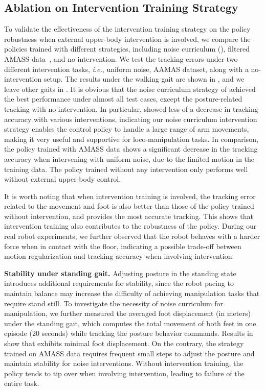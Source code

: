 \subsection{Ablation on Intervention Training Strategy}
\label{sec:InterventionExp}
To validate the effectiveness of the intervention training strategy on the policy robustness when external upper-body intervention is involved, we compare the policies trained with different strategies, including noise curriculum (\our), filtered AMASS data~\citep{he2024omnih2o}, and no intervention. We test the tracking errors under two different intervention tasks, \textit{i.e.}, uniform noise, AAMAS dataset, along with a no-intervention setup. The results under the walking gait are shown in , and we leave other gaits in . 
It is obvious that the noise curriculum strategy of \our achieved the best performance under almost all test cases, except the posture-related tracking with no intervention. 
In particular, \our showed less of a decrease in tracking accuracy with various interventions, indicating our noise curriculum intervention strategy enables the control policy to handle a large range of arm movements, making it very useful and supportive for loco-manipulation tasks.
In comparison, the policy trained with AMASS data shows a significant decrease in the tracking accuracy when intervening with uniform noise, due to the limited motion in the training data. The policy trained without any intervention only performs well without external upper-body control.

It is worth noting that when intervention training is involved, the tracking error related to the movement and foot is also better than those of the policy trained without intervention, and \our provides the most accurate tracking. This shows that intervention training also contributes to the robustness of the policy. During our real robot experiments, we further observed that the robot behaves with a harder force when in contact with the floor, indicating a possible trade-off between motion regularization and tracking accuracy when involving intervention.

\noindent\textbf{Stability under standing gait.}
Adjusting posture in the standing state introduces additional requirements for stability, since the robot pacing to maintain balance may increase the difficulty of achieving manipulation tasks that require stand still. To investigate the necessity of noise curriculum for manipulation, we further measured the averaged foot displacement (in meters) under the standing gait, which computes the total movement of both feet in one episode (20 seconds) while tracking the posture behavior commands. Results in  show that \our exhibits minimal foot displacement. On the contrary, the strategy trained on AMASS data requires frequent small steps to adjust the posture and maintain stability for noise interventions. 
Without intervention training, the policy tends to tip over when involving intervention, leading to failure of the entire task.

